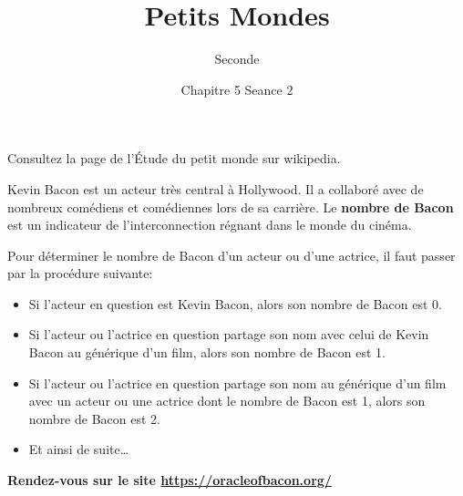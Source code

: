 \documentclass{controle}
\title{Petits Mondes}
\date{Chapitre 5 Seance 2}
\author{Seconde}
\begin{document}
\titleandname{}

\begin{questions}
Consultez la page de l'Étude du petit monde sur wikipedia.

\vspace*{0.5cm}

Kevin Bacon est un acteur très central à Hollywood. Il a collaboré avec de nombreux comédiens et comédiennes lors de sa carrière. Le \textbf{nombre de Bacon} est un indicateur de l'interconnection régnant dans le monde du cinéma.

Pour déterminer le nombre de Bacon d'un acteur ou d'une actrice, il faut passer par la procédure suivante:
\begin{itemize}
\item Si l'acteur en question est Kevin Bacon, alors son nombre de Bacon est 0.
\item Si l'acteur ou l'actrice en question partage son nom avec celui de Kevin Bacon au générique d'un film, alors son nombre de Bacon est 1.
\item Si l'acteur ou l'actrice en question partage son nom au générique d'un film avec un acteur ou une actrice dont le nombre de Bacon est 1, alors son nombre de Bacon est 2.
\item Et ainsi de suite\dots
\end{itemize}

\textbf{Rendez-vous sur le site \url{https://oracleofbacon.org/}}
\end{questions}
\end{document}
